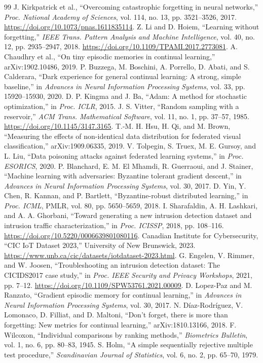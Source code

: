 \documentclass[10pt,a4paper]{article}
\begin{document}
\begin{thebibliography}{99}
 J. Kirkpatrick et al., \enquote{Overcoming catastrophic forgetting in neural networks,} \emph{Proc. National Academy of Sciences}, vol. 114, no. 13, pp. 3521--3526, 2017. \url{https://doi.org/10.1073/pnas.1611835114}.
 Z. Li and D. Hoiem, \enquote{Learning without forgetting,} \emph{IEEE Trans. Pattern Analysis and Machine Intelligence}, vol. 40, no. 12, pp. 2935--2947, 2018. \url{https://doi.org/10.1109/TPAMI.2017.2773081}.
 A. Chaudhry et al., \enquote{On tiny episodic memories in continual learning,} arXiv:1902.10486, 2019.
 P. Buzzega, M. Boschini, A. Porrello, D. Abati, and S. Calderara, \enquote{Dark experience for general continual learning: A strong, simple baseline,} in \emph{Advances in Neural Information Processing Systems}, vol. 33, pp. 15920--15930, 2020.
 D. P. Kingma and J. Ba, \enquote{Adam: A method for stochastic optimization,} in \emph{Proc. ICLR}, 2015.
 J. S. Vitter, \enquote{Random sampling with a reservoir,} \emph{ACM Trans. Mathematical Software}, vol. 11, no. 1, pp. 37--57, 1985. \url{https://doi.org/10.1145/3147.3165}.
 T.-M. H. Hsu, H. Qi, and M. Brown, \enquote{Measuring the effects of non-identical data distribution for federated visual classification,} arXiv:1909.06335, 2019.
 V. Tolpegin, S. Truex, M. E. Gursoy, and L. Liu, \enquote{Data poisoning attacks against federated learning systems,} in \emph{Proc. ESORICS}, 2020.
 P. Blanchard, E. M. El Mhamdi, R. Guerraoui, and J. Stainer, \enquote{Machine learning with adversaries: Byzantine tolerant gradient descent,} in \emph{Advances in Neural Information Processing Systems}, vol. 30, 2017.
 D. Yin, Y. Chen, R. Kannan, and P. Bartlett, \enquote{Byzantine-robust distributed learning,} in \emph{Proc. ICML}, PMLR, vol. 80, pp. 5650--5659, 2018.
 I. Sharafaldin, A. H. Lashkari, and A. A. Ghorbani, \enquote{Toward generating a new intrusion detection dataset and intrusion traffic characterization,} in \emph{Proc. ICISSP}, 2018, pp. 108--116. \url{https://doi.org/10.5220/0006639801080116}.
 Canadian Institute for Cybersecurity, \enquote{CIC IoT Dataset 2023,} University of New Brunswick, 2023. \url{https://www.unb.ca/cic/datasets/iotdataset-2023.html}.
 G. Engelen, V. Rimmer, and W. Joosen, \enquote{Troubleshooting an intrusion detection dataset: The CICIDS2017 case study,} in \emph{Proc. IEEE Security and Privacy Workshops}, 2021, pp. 7--12. \url{https://doi.org/10.1109/SPW53761.2021.00009}.
 D. Lopez-Paz and M. Ranzato, \enquote{Gradient episodic memory for continual learning,} in \emph{Advances in Neural Information Processing Systems}, vol. 30, 2017.
 N. D\'iaz-Rodr\'iguez, V. Lomonaco, D. Filliat, and D. Maltoni, \enquote{Don't forget, there is more than forgetting: New metrics for continual learning,} arXiv:1810.13166, 2018.
 F. Wilcoxon, \enquote{Individual comparisons by ranking methods,} \emph{Biometrics Bulletin}, vol. 1, no. 6, pp. 80--83, 1945.
 S. Holm, \enquote{A simple sequentially rejective multiple test procedure,} \emph{Scandinavian Journal of Statistics}, vol. 6, no. 2, pp. 65--70, 1979.
\end{thebibliography}
\end{document}
